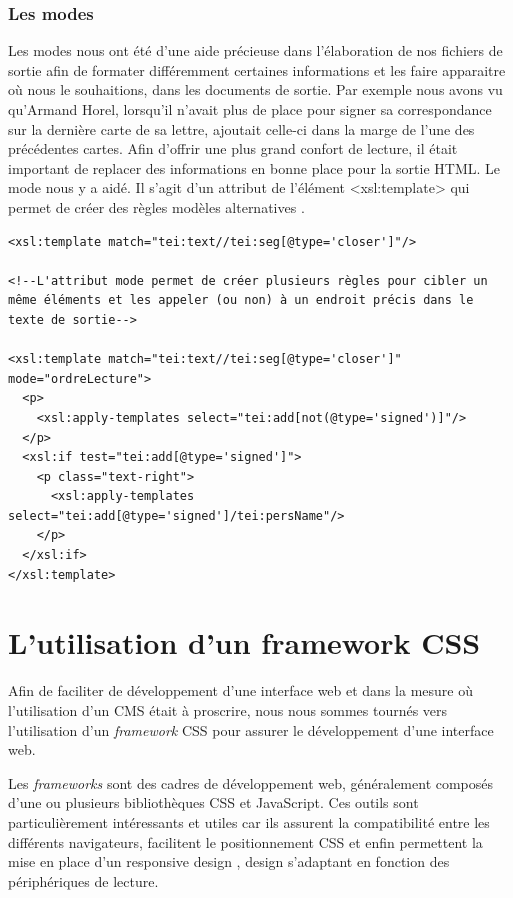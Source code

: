 \documentclass[12pt,a4paper]{book} %
\begin{document}
\subsection{Les modes}

Les modes nous ont été d'une aide précieuse dans l'élaboration de nos fichiers de sortie afin de formater différemment certaines informations et les faire apparaitre où nous le souhaitions, dans les documents de sortie. Par exemple nous avons vu qu'Armand Horel, lorsqu'il n'avait plus de place pour signer sa correspondance sur la dernière carte de sa lettre, ajoutait celle-ci dans la marge de l'une des précédentes cartes.
Afin d'offrir une plus grand confort de lecture, il était important de replacer des informations en bonne place pour la sortie HTML.
Le mode nous y a aidé. Il s'agit d'un attribut de l'élément <xsl:template> qui permet de créer des \og règles modèles alternatives \fg{}.

\begin{lstlisting}
<xsl:template match="tei:text//tei:seg[@type='closer']"/>
    
<!--L'attribut mode permet de créer plusieurs règles pour cibler un même éléments et les appeler (ou non) à un endroit précis dans le texte de sortie-->    
    
<xsl:template match="tei:text//tei:seg[@type='closer']" mode="ordreLecture">        
  <p>
    <xsl:apply-templates select="tei:add[not(@type='signed')]"/>                    
  </p>
  <xsl:if test="tei:add[@type='signed']">
    <p class="text-right">
      <xsl:apply-templates select="tei:add[@type='signed']/tei:persName"/> 
    </p>           
  </xsl:if>
</xsl:template>
\end{lstlisting}


\chapter{L'utilisation d'un framework CSS}

Afin de faciliter de développement d'une interface web et dans la mesure où l'utilisation d'un CMS était à proscrire, nous nous sommes tournés vers l'utilisation d'un \textit{framework} CSS pour assurer le développement d'une interface web. 

Les \textit{frameworks} sont des cadres de développement web, généralement composés d'une ou plusieurs bibliothèques CSS et JavaScript. Ces outils sont particulièrement intéressants et utiles car ils assurent la compatibilité entre les différents navigateurs, facilitent le positionnement CSS et enfin permettent la mise en place d'un \og responsive design \fg{}, design s'adaptant en fonction des périphériques de lecture.
\end{document}
